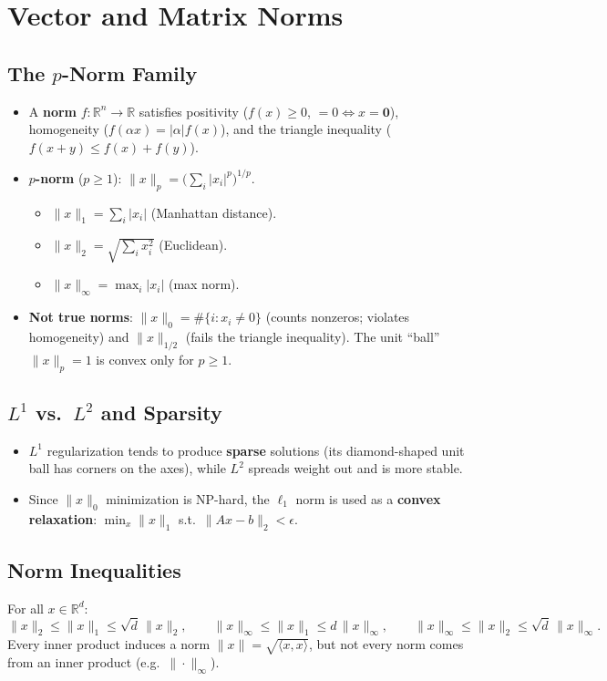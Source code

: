 \documentclass[hidelinks]{article}
\begin{document}
\section{Vector and Matrix Norms}

\subsection{The \texorpdfstring{$p$}{p}-Norm Family}
\begin{itemize}
    \item A \textbf{norm} $f:\mathbb{R}^n\to\mathbb{R}$ satisfies positivity ($f(x)\ge 0$, $=0\iff x=\mathbf 0$), homogeneity ($f(\alpha x)=|\alpha|f(x)$), and the triangle inequality ($f(x+y)\le f(x)+f(y)$).
    \item \textbf{$p$-norm} ($p\ge 1$): $\displaystyle \|x\|_p = \Big(\sum_{i}|x_i|^p\Big)^{1/p}$.
    \begin{itemize}
        \item $\|x\|_1 = \sum_i|x_i|$ (Manhattan distance).
        \item $\|x\|_2 = \sqrt{\sum_i x_i^2}$ (Euclidean).
        \item $\|x\|_\infty = \max_i|x_i|$ (max norm).
    \end{itemize}
    \item \textbf{Not true norms}: $\|x\|_0 = \#\{i: x_i\neq 0\}$ (counts nonzeros; violates homogeneity) and $\|x\|_{1/2}$ (fails the triangle inequality). The unit ``ball'' $\|x\|_p = 1$ is convex only for $p\ge 1$.
\end{itemize}

\subsection{$L^1$ vs.\ $L^2$ and Sparsity}
\begin{itemize}
    \item $L^1$ regularization tends to produce \textbf{sparse} solutions (its diamond-shaped unit ball has corners on the axes), while $L^2$ spreads weight out and is more stable.
    \item Since $\|x\|_0$ minimization is NP-hard, the $\ell_1$ norm is used as a \textbf{convex relaxation}: $\min_x \|x\|_1$ s.t.\ $\|Ax-b\|_2 < \epsilon$.
\end{itemize}

\subsection{Norm Inequalities}
For all $x\in\mathbb{R}^d$:
\[
    \|x\|_2 \le \|x\|_1 \le \sqrt{d}\,\|x\|_2,\qquad
    \|x\|_\infty \le \|x\|_1 \le d\,\|x\|_\infty,\qquad
    \|x\|_\infty \le \|x\|_2 \le \sqrt{d}\,\|x\|_\infty.
\]
Every inner product induces a norm $\|x\| = \sqrt{\langle x,x\rangle}$, but not every norm comes from an inner product (e.g.\ $\|\cdot\|_\infty$).
\end{document}
